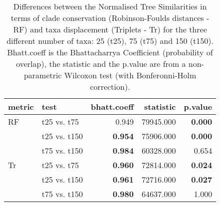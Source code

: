 \begin{table}[ht]
\centering
\begin{tabular}{llr|rr}
  \hline
metric & test & bhatt.coeff & statistic & p.value \\ 
  \hline
RF & t25 vs. t75 & 0.949 & 79945.000 & \textbf{0.000} \\ 
   & t25 vs. t150 & \textbf{0.954} & 75906.000 & \textbf{0.000} \\ 
   & t75 vs. t150 & \textbf{0.984} & 60328.000 & 0.654 \\ 
  Tr & t25 vs. t75 & \textbf{0.960} & 72814.000 & \textbf{0.024} \\ 
   & t25 vs. t150 & \textbf{0.961} & 72716.000 & \textbf{0.027} \\ 
   & t75 vs. t150 & \textbf{0.980} & 64637.000 & 1.000 \\ 
   \hline
\end{tabular}
\caption{Differences between the Normalised Tree Similarities in terms of clade conservation (Robinson-Foulds distances - RF) and taxa displacement (Triplets - Tr) for the three different number of taxa: 25 (t25), 75 (t75) and 150 (t150). Bhatt.coeff is the Bhattacharrya Coefficient (probability of overlap), the statistic and the p.value are from a non-parametric Wilcoxon test (with Bonferonni-Holm correction).} 
\label{Tab_pooledstaxa_test}
\end{table}
